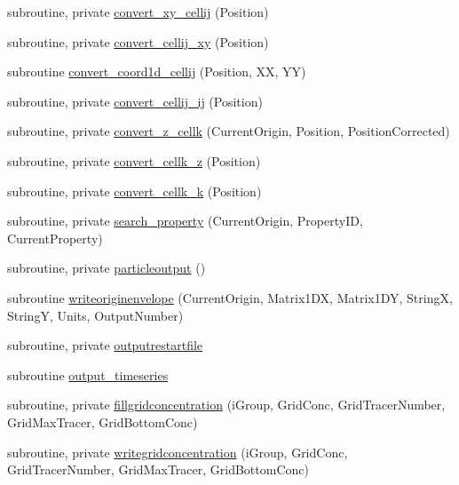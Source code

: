 \begin{DoxyCompactItemize}
subroutine, private \mbox{\hyperlink{namespacemodulelagrangian_ac9070324e55670920f08443dd42938d9}{convert\+\_\+xy\+\_\+cellij}} (Position)
\item 
subroutine, private \mbox{\hyperlink{namespacemodulelagrangian_afc4e34e45162b06f3c0a80ae1e000fe8}{convert\+\_\+cellij\+\_\+xy}} (Position)
\item 
subroutine \mbox{\hyperlink{namespacemodulelagrangian_a7675e0420886642ca2fa921c21fdaca5}{convert\+\_\+coord1d\+\_\+cellij}} (Position, XX, YY)
\item 
subroutine, private \mbox{\hyperlink{namespacemodulelagrangian_acf4d2d03d6e5a08dbd6f22a256ca3d91}{convert\+\_\+cellij\+\_\+ij}} (Position)
\item 
subroutine, private \mbox{\hyperlink{namespacemodulelagrangian_a457d6182588e8e1d9cc86c35a53690f7}{convert\+\_\+z\+\_\+cellk}} (Current\+Origin, Position, Position\+Corrected)
\item 
subroutine, private \mbox{\hyperlink{namespacemodulelagrangian_a57a623f0deb9516670279b9b6aad02a1}{convert\+\_\+cellk\+\_\+z}} (Position)
\item 
subroutine, private \mbox{\hyperlink{namespacemodulelagrangian_ab49d9104b72e09c3e511a3c37180d96b}{convert\+\_\+cellk\+\_\+k}} (Position)
\item 
subroutine, private \mbox{\hyperlink{namespacemodulelagrangian_a507e0e8500a409a6449e91da89ba4420}{search\+\_\+property}} (Current\+Origin, Property\+ID, Current\+Property)
\item 
subroutine, private \mbox{\hyperlink{namespacemodulelagrangian_aa775be66f039a949bf0d897457b63cab}{particleoutput}} ()
\item 
subroutine \mbox{\hyperlink{namespacemodulelagrangian_ad8e85e4295614bd67b14e48cf963619a}{writeoriginenvelope}} (Current\+Origin, Matrix1\+DX, Matrix1\+DY, StringX, StringY, Units, Output\+Number)
\item 
subroutine, private \mbox{\hyperlink{namespacemodulelagrangian_aeabb1bf3ca49fb9ff017aaf38a5ad02b}{outputrestartfile}}
\item 
subroutine \mbox{\hyperlink{namespacemodulelagrangian_a0fa6098d248ced3df6bda0b337789166}{output\+\_\+timeseries}}
\item 
subroutine, private \mbox{\hyperlink{namespacemodulelagrangian_a841c52a7705b666c34f7c0874d5c88d6}{fillgridconcentration}} (i\+Group, Grid\+Conc, Grid\+Tracer\+Number, Grid\+Max\+Tracer, Grid\+Bottom\+Conc)
\item 
subroutine, private \mbox{\hyperlink{namespacemodulelagrangian_ae773f710fefd7f114888e5227ec75766}{writegridconcentration}} (i\+Group, Grid\+Conc, Grid\+Tracer\+Number, Grid\+Max\+Tracer, Grid\+Bottom\+Conc)

\end{DoxyCompactItemize}
